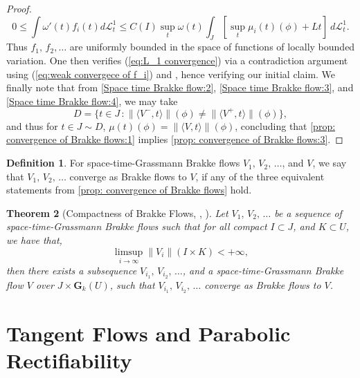 \documentclass{article}
\theoremstyle{plain}
\newtheorem{theorem}{Theorem}[section]
\theoremstyle{definition}
\newtheorem{definition}[theorem]{Definition}
\theoremstyle{plain}
\theoremstyle{remark}
\theoremstyle{remark}
\theoremstyle{plain}
\begin{document}
\begin{proof}
    \begin{equation*}
        0 \leq \textstyle \int \omega' (t) f_i (t) d \mathscr L^1_t \leq C(I) \sup_{t} \omega (t)\int_{J} [\sup_{t} \mu_{i} (t)(\phi) + L t] \ d \mathscr L^1_t.
    \end{equation*}
    Thus $f_{1}, \, f_{2}, \ldots$ are uniformly bounded in the space of functions of locally bounded variation. 
    One then verifies (\ref{eq:L_1 convergence}) via a contradiction argument using (\ref{eq:weak convergece of f_i}) and \cite[3.23]{ambrosio2000functions}, hence verifying our initial claim.
    We finally note that from \ref{Space time Brakke flow:2}, \ref{Space time Brakke flow:3}, and \ref{Space time Brakke flow:4}, we may take
    \begin{equation*}
        D = \{ t \in J \, \colon \| \langle V^{-}, t \rangle \| (\phi) \not= \| \langle V^{+}, t \rangle \| (\phi) \},
    \end{equation*}
    and thus for $t \in J \sim D$, $\mu (t) (\phi) = \| \langle V, t \rangle \| (\phi)$, concluding that \ref{prop: convergence of Brakke flows:1} implies \ref{prop: convergence of Brakke flows:3}.
\end{proof}

\begin{definition}
    For space-time-Grassmann Brakke flows $V_{1}, \, V_{2}, \, \ldots$, and $V$, we say that $V_{1}, \, V_{2}, \, \ldots$ converge as Brakke flows to $V$, if any of the three equivalent statements from \ref{prop: convergence of Brakke flows} hold.
\end{definition}

\begin{theorem}[Compactness of Brakke Flows, , ]\label{thm:compactness of Brakke flows}
    Let $V_{1}, \, V_{2}, \, \ldots$ be a sequence of space-time-Grassmann Brakke flows such that for all compact $I \subset J$, and $K \subset U$, we have that, 
    \begin{equation*}
        \limsup_{i \rightarrow \infty} \| V_{i} \| (I \times K) < + \infty,
    \end{equation*}
    then there exists a subsequence $V_{i_{1}}, \, V_{i_{2}}, \, \ldots$, and a space-time-Grassmann Brakke flow $V$ over $J \times \mathbf{G}_{k} (U)$, such that $V_{i_{1}}, \, V_{i_{2}}, \, \ldots$ converge as Brakke flows to $V$.
\end{theorem}

\section{Tangent Flows and Parabolic Rectifiability}\label{sec: parabolic rectifiability}
\end{document}
